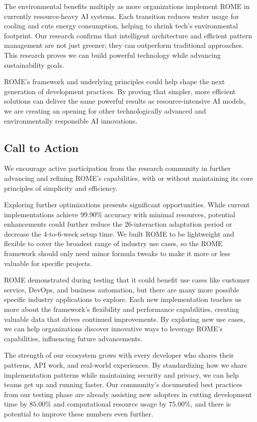 \documentclass[12pt]{article}
\begin{document}
The environmental benefits multiply as more organizations implement ROME in currently resource-heavy AI systems. Each transition reduces water usage for cooling and cuts energy consumption, helping to shrink tech's environmental footprint. Our research confirms that intelligent architecture and efficient pattern management are not just greener; they can outperform traditional approaches. This research proves we can build powerful technology while advancing sustainability goals.

ROME's framework and underlying principles could help shape the next generation of development practices. By proving that simpler, more efficient solutions can deliver the same powerful results as resource-intensive AI models, we are creating an opening for other technologically advanced and environmentally responsible AI innovations.

\subsection{Call to Action}
We encourage active participation from the research community in further advancing and refining ROME's capabilities, with or without maintaining its core principles of simplicity and efficiency.

Exploring further optimizations presents significant opportunities. While current implementations achieve $99.90\%$ accuracy with minimal resources, potential enhancements could further reduce the 26-interaction adaptation period or decrease the 4-to-6-week setup time. We built ROME to be lightweight and flexible to cover the broadest range of industry use cases, so the ROME framework should only need minor formula tweaks to make it more or less valuable for specific projects.

ROME demonstrated during testing that it could benefit use cases like customer service, DevOps, and business automation, but there are many more possible specific industry applications to explore. Each new implementation teaches us more about the framework's flexibility and performance capabilities, creating valuable data that drives continued improvements. By exploring new use cases, we can help organizations discover innovative ways to leverage ROME's capabilities, influencing future advancements.

The strength of our ecosystem grows with every developer who shares their patterns, API work, and real-world experiences. By standardizing how we share implementation patterns while maintaining security and privacy, we can help teams get up and running faster. Our community's documented best practices from our testing phase are already assisting new adopters in cutting development time by $85.00\%$ and computational resource usage by $75.00\%$, and there is potential to improve these numbers even further.
\end{document}
